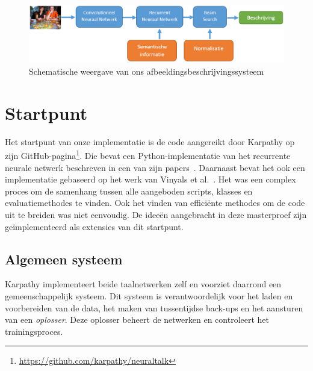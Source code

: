 \begin{figure}
\centering
\includegraphics[width=\linewidth]{Images/system_overview}
\caption{Schematische weergave van ons afbeeldingsbeschrijvingssysteem}
\label{fig:system_overview}
\end{figure}



\section{Startpunt}
Het startpunt van onze implementatie is de code aangereikt door Karpathy op zijn GitHub-pagina\footnote{\url{https://github.com/karpathy/neuraltalk}}. Die bevat een Python-implementatie van het recurrente neurale netwerk beschreven in een van zijn papers~\cite{Karpathy2015}. Daarnaast bevat het ook een implementatie gebaseerd op het werk van Vinyals et al.~\cite{Google}. Het was een complex proces om de samenhang tussen alle aangeboden scripts, klasses en evaluatiemethodes te vinden. Ook het vinden van effici\"ente methodes om de code uit te breiden was niet eenvoudig. De idee\"en aangebracht in deze masterproef zijn ge\"implementeerd als extensies van dit startpunt.

\subsection{Algemeen systeem}
Karpathy implementeert beide taalnetwerken zelf en voorziet daarrond een gemeenschappelijk systeem. Dit systeem is verantwoordelijk voor het laden en voorbereiden van de data, het maken van tussentijdse back-ups en het aansturen van een \emph{oplosser}. Deze oplosser beheert de netwerken en controleert het trainingsproces.

